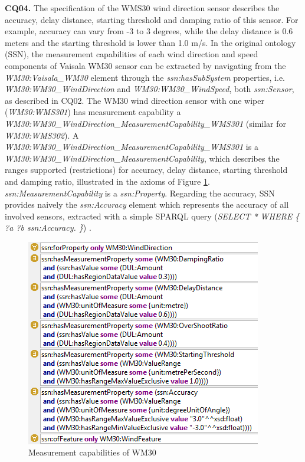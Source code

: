 \documentclass{sig-alternate-05-2015}
\begin{document}
\noindent
\textbf{CQ04.} The specification of the WMS30 wind direction sensor describes the accuracy, delay distance, starting threshold and damping ratio of this sensor. For example, accuracy can vary from -3 to 3 degrees, while the delay distance is 0.6 meters and the starting threshold is lower than 1.0 m/s.  
In the original ontology (SSN), the measurement capabilities of each wind direction and speed components  of Vaisala WM30 sensor can be extracted by navigating from the \textit{WM30:\-Vaisala\-\_WM30} element through the \textit{ssn:\-hasSubSystem} properties, i.e. \textit{WM30:\-WM30\-\_Wind\-Direction} and \textit{WM30:\-WM30\-\_WindSpeed}, both \textit{ssn:\-Sensor}, as described in CQ02. The WM30 wind direction sensor with one wiper (\textit{WM30:\-WMS301}) has measurement capability a  \textit{WM30:\-WM30\-\_Wind\-Direction\-\_MeasurementCapability\-\_WMS301} (similar for \textit{WM30:\-WMS302}). A \textit{WM30:\-WM30\-\_Wind\-Direction\-\_MeasurementCapability\-\_WMS301} is a \textit{WM30:\-WM30\-\_Wind\-Direction\-\_MeasurementCapability}, which describes the ranges supported (restrictions) for accuracy, delay distance, starting threshold and damping ratio, illustrated in the axioms of Figure \ref{fig:SSN_MeasurementCapability}. \textit{ssn:\-MeasurementCapability} is a \textit{ssn:\-Property}.
Regarding the accuracy, SSN provides naively the \textit{ssn:\-Accuracy} element which represents the accuracy of all involved sensors, extracted with a simple SPARQL query (\textit{SELECT * WHERE \{ ?a ?b ssn:\-Accuracy. \}}) .  
\begin{figure}[h!]
\centering
\includegraphics[scale=0.81]{SSN_MeasurementCapability}
\caption{Measurement capabilities of WM30} 
\label{fig:SSN_MeasurementCapability}
\end{figure}
\end{document}
